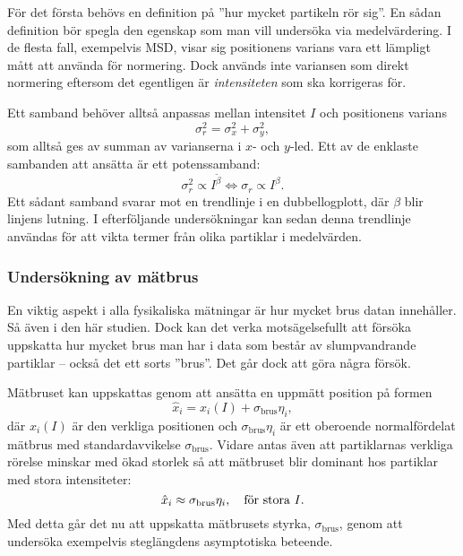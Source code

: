 För det första behövs en definition på ''hur mycket partikeln rör sig''. En sådan definition bör spegla den egenskap som man vill undersöka via medelvärdering. I de flesta fall, exempelvis MSD, visar sig positionens varians vara ett lämpligt mått att använda för normering. Dock används inte variansen som direkt normering eftersom det egentligen är \emph{intensiteten} som ska korrigeras för.

Ett samband behöver alltså anpassas mellan intensitet $I$ och positionens varians
\begin{equation}
\sigma_r^2=\sigma_x^2+\sigma_y^2,
\end{equation}
som alltså ges av summan av varianserna i $x$- och $y$-led.
Ett av de enklaste sambanden att ansätta är ett potenssamband:
\begin{equation}
\sigma_r^2 \propto I^{\tilde\beta} 
\Longleftrightarrow 
\sigma_r \propto I^\beta.
\end{equation}
Ett sådant samband svarar mot en trendlinje i en dubbellogplott, där $\beta$ blir linjens lutning. I efterföljande undersökningar kan sedan denna trendlinje användas för att vikta termer från olika partiklar i medelvärden. %

\subsubsection{Undersökning av mätbrus}
En viktig aspekt i alla fysikaliska mätningar är hur mycket brus datan innehåller. Så även i den här studien. Dock kan det verka motsägelsefullt att försöka uppskatta hur mycket brus man har i data som består av slumpvandrande partiklar -- också det ett sorts ''brus''. Det går dock att göra några försök. 

Mätbruset kan uppskattas genom att ansätta en uppmätt position på formen
\begin{equation}
\hat{x}_i = x_i(I) + \sigma_\text{brus}\eta_i,
\end{equation}
där $x_i(I)$ är den verkliga positionen och $\sigma_\text{brus}\eta_i$ är ett oberoende normalfördelat mätbrus med standardavvikelse $\sigma_\text{brus}$. Vidare antas även att partiklarnas verkliga rörelse minskar med ökad storlek så att mätbruset blir dominant hos partiklar med stora intensiteter:
\begin{equation}\label{eq:approx_noise}
\hat{x}_i \approx \sigma_\text{brus}\eta_i \qcomma \text{för stora } I.
\end{equation}
Med detta går det nu att uppskatta mätbrusets styrka, $\sigma_\text{brus}$, genom att undersöka exempelvis steglängdens asymptotiska beteende. 

